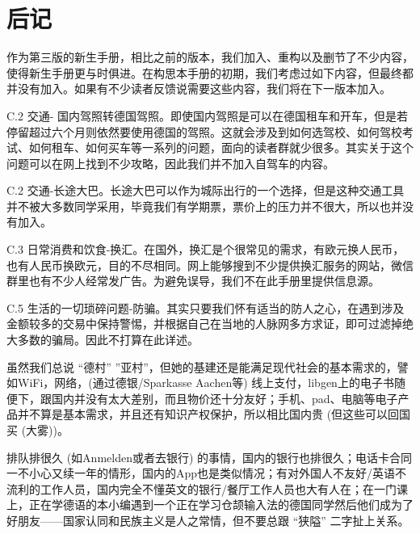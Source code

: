 
\chapter*{后记}


  作为第三版的新生手册，相比之前的版本，我们加入、重构以及删节了不少内容，使得新生手册更与时俱进。在构思本手册的初期，我们考虑过如下内容，但最终都并没有加入。如果有不少读者反馈说需要这些内容，我们将在下一版本加入。

  C.2 交通- 国内驾照转德国驾照。即使国内驾照是可以在德国租车和开车，但是若停留超过六个月则依然要使用德国的驾照。这就会涉及到如何选驾校、如何驾校考试、如何租车、如何买车等一系列的问题，面向的读者群就少很多。其实关于这个问题可以在网上找到不少攻略，因此我们并不加入自驾车的内容。

  C.2 交通-长途大巴。长途大巴可以作为城际出行的一个选择，但是这种交通工具并不被大多数同学采用，毕竟我们有学期票，票价上的压力并不很大，所以也并没有加入。

  C.3 日常消费和饮食-换汇。在国外，换汇是个很常见的需求，有欧元换人民币，也有人民币换欧元，目的不尽相同。网上能够搜到不少提供换汇服务的网站，微信群里也有不少人经常发广告。为避免误导，我们不在此手册里提供信息源。

  C.5 生活的一切琐碎问题-防骗。其实只要我们怀有适当的防人之心，在遇到涉及金额较多的交易中保持警惕，并根据自己在当地的人脉网多方求证，即可过滤掉绝大多数的骗局。因此不打算在此详述。

  虽然我们总说 “德村” ”亚村”，但她的基建还是能满足现代社会的基本需求的，譬如WiFi，网络，(通过德银/Sparkasse Aachen等) 线上支付，libgen上的电子书随便下，跟国内并没有太大差别，而且物价还十分友好；手机、pad、电脑等电子产品并不算是基本需求，并且还有知识产权保护，所以相比国内贵 (但这些可以回国买 (大雾))。

  排队排很久 (如Anmelden或者去银行) 的事情，国内的银行也排很久；电话卡合同一不小心又续一年的情形，国内的App也是类似情况；有对外国人不友好/英语不流利的工作人员，国内完全不懂英文的银行/餐厅工作人员也大有人在；在一门课上，正在学德语的本小编遇到一个正在学习仓颉输入法的德国同学然后他们成为了好朋友——国家认同和民族主义是人之常情，但不要总跟 “狭隘” 二字扯上关系。

